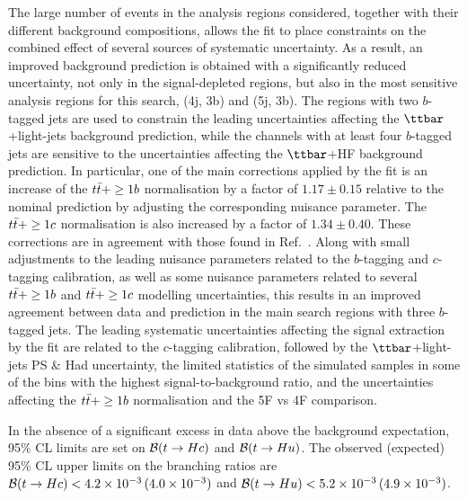 The large number of events in the analysis regions considered, together with their different background compositions, allows
the fit to place constraints on the combined effect of several sources of systematic uncertainty.
As a result, an improved background prediction is obtained with a significantly reduced uncertainty, not only in the 
signal-depleted regions, but also in the most sensitive analysis regions for this search, (4j, 3b) and (5j, 3b).
The regions with two $b$-tagged jets are used to constrain the leading uncertainties affecting the $\ttbar$+light-jets background prediction,
while the channels with at least four $b$-tagged jets are sensitive to the uncertainties affecting the $\ttbar$+HF background prediction.  
In particular, one of the main corrections applied by the fit is an increase of the $t\bar{t}+\geq1b$ normalisation by a factor of $1.17 \pm  0.15$ 
relative to the nominal prediction by adjusting the corresponding nuisance parameter.  The $t\bar{t}+\geq1c$ normalisation is also increased
by a factor of $1.34 \pm  0.40$. These corrections are in agreement with those found in Ref.~\cite{Aaboud:2017rss}.
Along with small adjustments to the leading nuisance parameters related to the $b$-tagging and $c$-tagging calibration,
as well as some nuisance parameters related to several $t\bar{t}+\geq1b$ and $t\bar{t}+\geq1c$ modelling uncertainties, this results in an improved 
agreement between data and prediction in the main search regions with three $b$-tagged jets.
The leading systematic uncertainties affecting the signal extraction by the fit are related to the $c$-tagging calibration,
followed by the $\ttbar$+light-jets PS \& Had uncertainty, the limited statistics of the simulated samples in some of the bins with 
the highest signal-to-background ratio, and the uncertainties affecting the $t\bar{t}+\geq1b$ normalisation and the 5F vs 4F comparison.

In the absence of a significant excess in data above the background expectation, 95\% CL limits are set on $\mathcal{B}(t\to Hc)$ and $\mathcal{B}(t\to Hu)$.
The observed (expected) 95\% CL upper limits on the branching ratios 
are $\mathcal{B}(t\to Hc)<4.2 \times 10^{-3}\,(4.0 \times 10^{-3})$ and $\mathcal{B}(t\to Hu)<5.2 \times 10^{-3}\,(4.9 \times 10^{-3})$.

